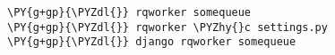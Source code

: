 \begin{Verbatim}[commandchars=\\\{\}]
\PY{g+gp}{\PYZdl{}} rqworker somequeue
\PY{g+gp}{\PYZdl{}} rqworker \PYZhy{}c settings.py
\PY{g+gp}{\PYZdl{}} django rqworker somequeue
\end{Verbatim}
